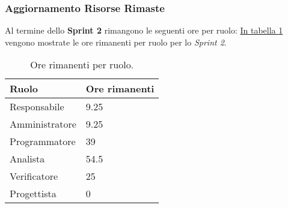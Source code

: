 \subsubsection{Aggiornamento Risorse Rimaste}
\label{sec:AggiornamentoRisorse_Sprint2}
Al termine dello \textbf{Sprint 2} rimangono le seguenti ore per ruolo: \hyperref[tab:sprint2_ore_rimanenti]{In tabella \ref{tab:sprint2_ore_rimanenti}} vengono mostrate le ore rimanenti per ruolo per lo \textit{Sprint 2}.

\begin{table}[H]
    \centering
    \begin{tabular}{| l | l |}
    \hline
    \textbf{Ruolo} & 
    \textbf{Ore rimanenti}\\
    \hline
        Responsabile & 9.25\\
    \hline
        Amministratore & 9.25\\
    \hline
        Programmatore & 39\\
    \hline
        Analista & 54.5\\
    \hline
        Verificatore & 25 \\
    \hline
        Progettista & 0\\
    \hline
    \end{tabular}
    \caption{Ore rimanenti per ruolo.}
    \label{tab:sprint2_ore_rimanenti} 
\end{table}